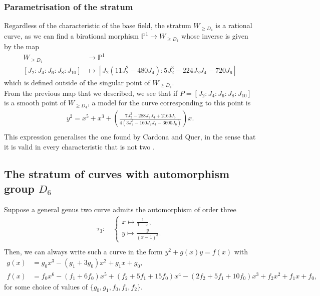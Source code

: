 \documentclass{amsart}
\numberwithin{equation}{section}
\theoremstyle{definition}
\theoremstyle{remark}
\begin{document}
\subsubsection{Parametrisation of the stratum}
Regardless of the characteristic of the base field, the stratum $W_{\geq D_4}$ is a rational curve, as we can find a birational morphism $\mathbb{P}^1\rightarrow W_{\geq D_4}$ whose inverse is given by the map
\begin{align*}
W_{\geq D_4} &\longrightarrow \mathbb{P}^1\\
[J_2:J_4:J_6:J_8:J_{10}]&\longmapsto[J_2(11J_2^2 - 480J_4): 5J_2^3 - 224J_2J_4 - 720J_6]
\end{align*}
which is defined outside of the singular point of $W_{\geq D_4}$.\\

From the previous map that we described, we see that if $P=[J_2:J_4:J_6:J_8:J_{10}]$ is a smooth point of $W_{\geq D_4}$, a model for the curve corresponding to this point is
\begin{align*}
y^2=x^5+x^3+\left(\frac{7 J_2^3 - 288 J_2 J_4 + 2160 J_6}{4 (3 J_2^3 - 160 J_2 J_4 - 3600 J_6)}\right)x.\\
\end{align*}
This expression generalises the one found by Cardona and Quer, in the sense that it is valid in every characteristic that is not two \cite[Proposition 2.1]{Cardona2007CurvesD12}.\\

\subsection{The stratum of curves with automorphism group \texorpdfstring{$D_6$}{D6}} \label{D6_subsection}
Suppose a general genus two curve admits the automorphism of order three
\begin{align*}
\tau_3\colon\quad\begin{cases}
    x\mapsto \frac{1}{1-x},\\
    y\mapsto \frac{y}{(x-1)^3}.
    \end{cases}\\
\end{align*}
Then, we can always write such a curve in the form $y^2+g(x)y=f(x)$ with
\begin{align*} 
g(x)&=g_0 x^3-(g_1+3g_0)x^2+g_1 x+g_0,\\
f(x)&=f_0 x^6-(f_1+6 f_0 )x^5+(f_2+5f_1+15f_0)x^4-(2f_2+5f_1+10f_0)x^3+f_2 x^2+f_1x +f_0,
\end{align*}
for some choice of values of $\{g_0,g_1,f_0,f_1,f_2\}$.\\
\end{document}
